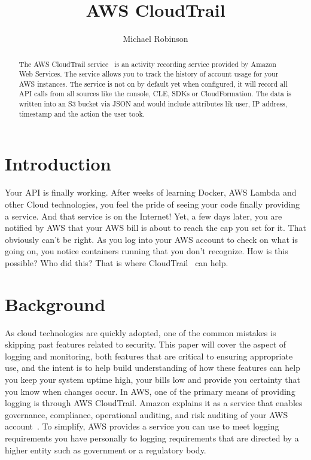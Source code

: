 \title{AWS CloudTrail}

\author{Michael Robinson}


\renewcommand{\shortauthors}{M. Robinson}


\begin{abstract}
The AWS CloudTrail service~\cite{hid-sp18-518-CloudTrail} is an activity recording service provided by Amazon Web Services. The service allows you to track the history of account usage for your AWS instances. The service is not on by default yet when configured, it will record all API calls from all sources like the console, CLE, SDKs or CloudFormation. The data is written into an S3 bucket via JSON and would include attributes lik user, IP address, timestamp and the action the user took.
\end{abstract}


\maketitle

\section{Introduction}

Your API is finally working. After weeks of learning Docker, AWS Lambda and other Cloud technologies, you feel the pride of seeing your code finally providing a service. And that service is on the Internet! Yet, a few days later, you are notified by AWS that your AWS bill is about to reach the cap you set for it. That obviously can’t be right. As you log into your AWS account to check on what is going on, you notice containers running that you don’t recognize. How is this possible? Who did this? That is where CloudTrail~\cite{hid-sp18-518-CloudTrail} can help.

\section{Background}

As cloud technologies are quickly adopted, one of the common mistakes is skipping past features related to security. This paper will cover the aspect of logging and monitoring, both features that are critical to ensuring appropriate use, and the intent is to help build understanding of how these features can help you keep your system uptime high, your bills low and provide you certainty that you know when changes occur.
In AWS, one of the primary means of providing logging is through AWS CloudTrail. Amazon explains it as a service that enables governance, compliance, operational auditing, and risk auditing of your AWS account~\cite{hid-sp18-518-CloudTrail-user-guide}. To simplify, AWS provides a service you can use to meet logging requirements you have personally to logging requirements that are directed by a higher entity such as government or a regulatory body.


